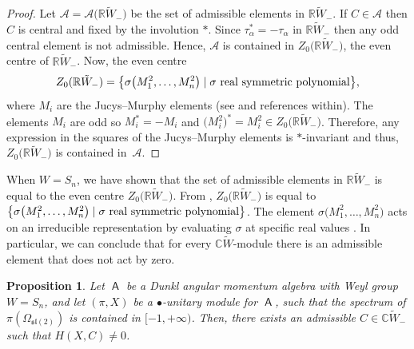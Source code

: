 \documentclass[10pt,a4paper]{amsart}
\numberwithin{equation}{section}
\newtheorem{Proposition}[Theorem]{Proposition}
 { \theoremstyle{definition}
\newtheorem{Definition}[Theorem]{Definition}
\newtheorem{Note}[Theorem]{Note}
\newtheorem{Example}[Theorem]{Example}
\newtheorem{Remark}[Theorem]{Remark} }
\newcommand{\bbc}{\mathbb{C}}
\newcommand{\bbr}{\mathbb{R}}
\DeclareMathOperator{\ama}{\mathsf{A}}
\begin{document}
\begin{proof} Let $\mathcal{A} =\mathcal{A}\big(\bbr\tilde{W}_-\big)$ be the set of admissible elements in $\bbr \tilde{W}_-$. If $C \in \mathcal{A}$ then $C$ is central and fixed by the involution $*$. Since $\tau_\alpha^* = -\tau_\alpha$ in $\bbr\tilde{W}_-$ then any odd central element is not admissible. Hence, $\mathcal{A}$ is contained in $Z_0\big(\bbr\tilde{W}_-\big)$, the even centre of $\bbr\tilde{W}_-$. Now, the even centre
\[Z_0(\bbr\tilde{W}_-)=\big\{\sigma\big(M_1^2,\dots,M_n^2\big)\mid \sigma \textup{ real symmetric polynomial}\big\},
\] where $M_i$ are the Jucys--Murphy elements (see \cite[Lemma~13.1.2, Remark~13.1.3]{K05} and references within). The elements $M_i$ are odd so $M_i^*= -M_i$ and $\big(M_i^2\big)^*=M_i^2\in Z_0\big(\bbr\tilde{W}_-\big)$. Therefore, any expression in the squares of the Jucys--Murphy elements is $*$-invariant and thus, $Z_0\big(\bbr\tilde{W}_-\big)$ is contained in~$\mathcal{A}$.
\end{proof}

\begin{Remark}\label{r:actionofC}
When $W=S_n$, we have shown that the set of admissible elements in $\bbr\tilde{W}_-$ is equal to the even centre $Z_0\big(\bbr\tilde{W}
_-\big)$.
From \cite{K05}, $Z_0\big(\bbr\tilde{W}_-\big)$ is equal to $\big\{\sigma\big(M_1^2,\dots,M_n^2\big)\mid \sigma \textup{ real symmetric polynomial}\big\}$. The element $\sigma\big(M_1^2,\dots,M_n^2\big)$ acts on an irreducible representation by evaluating $\sigma$ at specific real values \cite[Corollary~6.3]{C18}. In particular, we can conclude that for every $\bbc\tilde{W}$-module there is an admissible element that does not act by zero.
\end{Remark}

\begin{Proposition}\label{p:nonzerocoh}
Let $\ama$ be a Dunkl angular momentum algebra with Weyl group $W=S_n$, and let $(\pi,X)$ be a $\bullet$-unitary module for $\ama$, such that the spectrum of $\pi(\Omega_{\mathfrak{sl}(2)})$ is contained in $[-1, + \infty)$. Then, there exists an admissible $C \in \bbc \tilde{W}_-$ such that $H(X,C) \neq 0$.
\end{Proposition}
\end{document}
